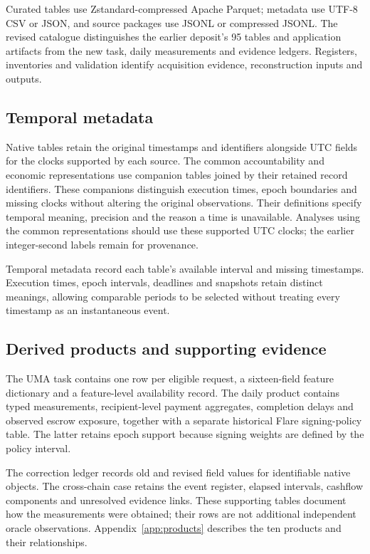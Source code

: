 

Curated tables use Zstandard-compressed Apache Parquet; metadata use UTF-8 CSV or JSON, and source packages use JSONL or compressed JSONL. The revised catalogue distinguishes the earlier deposit's 95 tables and application artifacts from the new task, daily measurements and evidence ledgers. Registers, inventories and validation identify acquisition evidence, reconstruction inputs and outputs.

\subsection{Temporal metadata}

Native tables retain the original timestamps and identifiers alongside UTC fields for the clocks supported by each source. The common accountability and economic representations use companion tables joined by their retained record identifiers. These companions distinguish execution times, epoch boundaries and missing clocks without altering the original observations. Their definitions specify temporal meaning, precision and the reason a time is unavailable. Analyses using the common representations should use these supported UTC clocks; the earlier integer-second labels remain for provenance.

Temporal metadata record each table's available interval and missing timestamps. Execution times, epoch intervals, deadlines and snapshots retain distinct meanings, allowing comparable periods to be selected without treating every timestamp as an instantaneous event.

\subsection{Derived products and supporting evidence}

The UMA task contains one row per eligible request, a sixteen-field feature dictionary and a feature-level availability record. The daily product contains typed measurements, recipient-level payment aggregates, completion delays and observed escrow exposure, together with a separate historical Flare signing-policy table. The latter retains epoch support because signing weights are defined by the policy interval.

The correction ledger records old and revised field values for identifiable native objects. The cross-chain case retains the event register, elapsed intervals, cashflow components and unresolved evidence links. These supporting tables document how the measurements were obtained; their rows are not additional independent oracle observations. Appendix~\ref{app:products} describes the ten products and their relationships.
